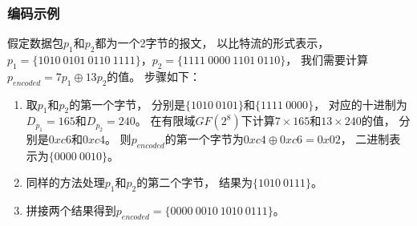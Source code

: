 \begin{frame}
	\frametitle{编码示例}
	假定数据包$p_{1}$和$p_{2}$都为一个2字节的报文，
	以比特流的形式表示，
	$p_{1}=\{1010\ 0101\ 0110\ 1111\}$，$p_{2}=\{1111\ 0000\ 1101\ 0110\}$，
	我们需要计算$p_{encoded}=7p_{1} \oplus 13p_{2}$的值。
	步骤如下：
	\begin{enumerate}[(1)]
		\item 取$p_{1}$和$p_{2}$的第一个字节，
		分别是$\{1010\ 0101\}$和$\{1111\ 0000\}$，
		对应的十进制为$D_{p_1}=165$和$D_{p_2}=240$。
		在有限域$GF(2^8)$下计算$7\times 165$和$13 \times 240$的值，
		分别是$0xc6$和$0xc4$。
		则$p_{encoded}$的第一个字节为$0xc4 \oplus 0xc6=0x02$，
		二进制表示为$\{0000\ 0010\}$。
		\item 同样的方法处理$p_{1}$和$p_{2}$的第二个字节，
		结果为$\{1010\ 0111\}$。
		\item 拼接两个结果得到$p_{encoded}=\{0000\ 0010\ 1010\ 0111\}$。
	\end{enumerate}
\end{frame}
